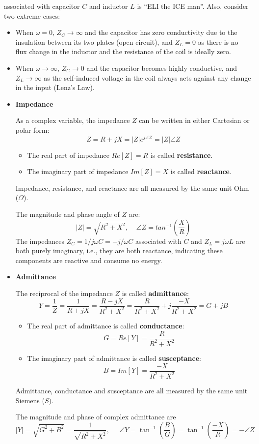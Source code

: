 associated with capacitor $C$ and inductor $L$ is ``ELI the ICE man''. 
Also, consider two extreme cases:
\begin{itemize}
\item When $\omega=0$, $Z_C\rightarrow \infty$ and the capacitor has zero 
  conductivity due to the insulation between its two plates (open circuit),
  and $Z_L=0$ as there is no flux change in the inductor and the resistance 
  of the coil is ideally zero.
\item When $\omega\rightarrow \infty$, $Z_C\rightarrow 0$ and the capacitor 
  becomes highly conductive, and $Z_L\rightarrow \infty$ as the self-induced
  voltage in the coil always acts against any change in the input (Lenz's Law).
\end{itemize}




\begin{itemize}
  \item {\bf Impedance}

    As a complex variable, the impedance $Z$ can be written in either
    Cartesian or polar form:
    \[	
    Z=R+jX=|Z|e^{j\angle Z}=|Z|\angle Z	
    \]
    \begin{itemize}
    \item The real part of impedance $Re[Z]=R$ is called {\bf resistance}. 
    \item The imaginary part of impedance  $Im[Z]=X$ is called {\bf reactance}. 
    \end{itemize}
    Impedance, resistance, and reactance are all measured by the same unit 
    Ohm ($\Omega$). 

    The magnitude and phase angle of $Z$ are:
    \[
    |Z|=\sqrt{R^2+X^2},\;\;\;\;\angle Z=tan^{-1}\left(\frac{X}{R}\right)	
    \]
    The impedances $Z_C=1/j\omega C=-j/\omega C$ associated with $C$ and 
    $Z_L=j\omega L$ are both purely imaginary, i.e., they are both reactance,
    indicating these components are reactive and consume no energy.

\item {\bf Admittance}

  The reciprocal of the impedance $Z$ is called {\bf admittance}:
  \[
  Y=\frac{1}{Z}=\frac{1}{R+jX}=\frac{R-jX}{R^2+X^2}
  =\frac{R}{R^2+X^2}+j\frac{-X}{R^2+X^2}=G+jB	
  \]
  \begin{itemize}
  \item The real part of admittance is called {\bf conductance}:
    \[	G=Re[Y]=\frac{R}{R^2+X^2}	\]
  \item The imaginary part of admittance is called {\bf susceptance}:
    \[	B=Im[Y]=\frac{-X}{R^2+X^2}	\]
  \end{itemize}
  Admittance, conductance and susceptance are all measured by the same 
  unit Siemens ($S$). 

  The magnitude and phase of complex admittance are
  \[
  |Y|=\sqrt{G^2+B^2}=\frac{1}{\sqrt{R^2+X^2}},\;\;\;\;\;
  \angle Y=\tan^{-1} \left(\frac{B}{G}\right)=\tan^{-1} \left(\frac{-X}{R}\right)
  =-\angle Z	
  \]
\end{itemize}

